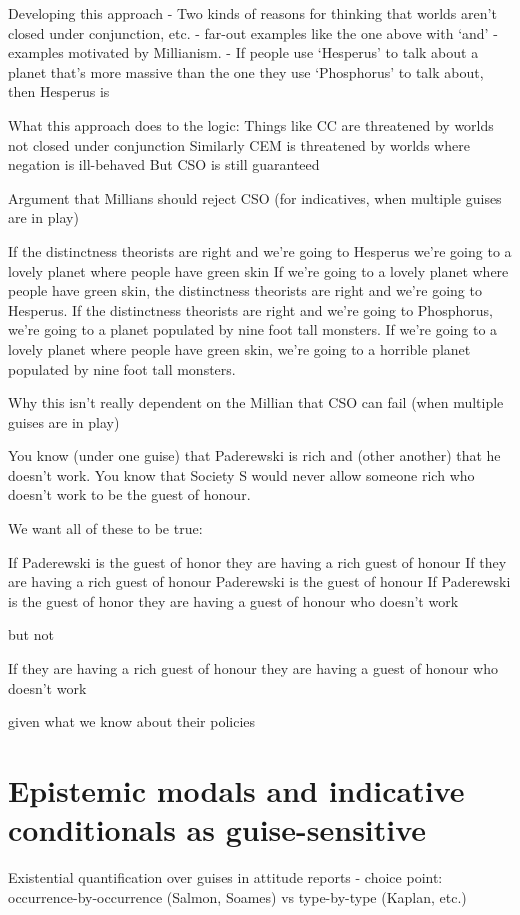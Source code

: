 \documentclass[If.tex]{subfiles}
\begin{document}
Developing this approach
	- Two kinds of reasons for thinking that worlds aren't closed under conjunction, etc.
		- far-out examples like the one above with ‘and’
		- examples motivated by Millianism.  
			- If people use ‘Hesperus’ to talk about a planet that's more massive than the one they use ‘Phosphorus’ to talk about, then Hesperus is 

What this approach does to the logic:
		Things like CC are threatened by worlds not closed under conjunction
			Similarly CEM is threatened by worlds where negation is ill-behaved
		But CSO is still guaranteed
		
Argument that Millians should reject CSO (for indicatives, when multiple guises are in play)

If the distinctness theorists are right and we're going to Hesperus we're going to a lovely planet where people have green skin
If we're going to a lovely planet where people have green skin, the distinctness theorists are right and we're going to Hesperus.
If the distinctness theorists are right and we're going to Phosphorus, we're going to a planet populated by nine foot tall monsters.
If we're going to a lovely planet where people have green skin, we're going to a horrible planet populated by nine foot tall monsters.

Why this isn't really dependent on the Millian  that CSO can fail (when multiple guises are in play)

You know (under one guise) that Paderewski is rich and (other another) that he doesn't work. 
You know that Society S would never allow someone rich who doesn't work to be the guest of honour.

We want all of these to be true: 

If Paderewski is the guest of honor they are having a rich guest of honour
If they are having a rich guest of honour Paderewski is the guest of honour
If Paderewski is the guest of honor they are having a guest of honour who doesn't work

but not

If they are having a rich guest of honour they are having a guest of honour who doesn't work

given what we know about their policies


\section{Epistemic modals and indicative conditionals as guise-sensitive}
Existential quantification over guises in attitude reports 
	- choice point: occurrence-by-occurrence (Salmon, Soames) vs type-by-type (Kaplan, etc.)
\end{document}
